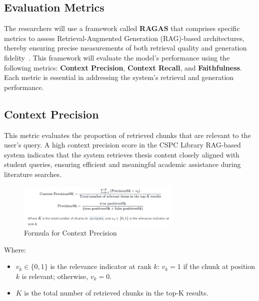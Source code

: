 \begin{refsection}
\section{Evaluation Metrics}

\hspace{0.4cm}The researchers will use a framework called \textbf{RAGAS} that comprises specific metrics to assess Retrieval-Augmented Generation (RAG)-based architectures, thereby ensuring precise measurements of both retrieval quality and generation fidelity~\cite{oubah2024advanced}. This framework will evaluate the model's performance using the following metrics: \textbf{Context Precision}, \textbf{Context Recall}, and \textbf{Faithfulness}. Each metric is essential in addressing the system’s retrieval and generation performance.

\subsection*{Context Precision}

This metric evaluates the proportion of retrieved chunks that are relevant to the user’s query. A high context precision score in the CSPC Library RAG-based system indicates that the system retrieves thesis content closely aligned with student queries, ensuring efficient and meaningful academic assistance during literature searches.


\begin{figure}[H]
\centering
\includegraphics[width=0.7\textwidth]{figures/context_precision_formula.png}
\caption{Formula for Context Precision}
\label{fig:context_precision}
\end{figure}

\noindent Where:
\begin{itemize}
    \item $v_k \in \{0,1\}$ is the relevance indicator at rank $k$: $v_k = 1$ if the chunk at position $k$ is relevant; otherwise, $v_k = 0$.
    \item $K$ is the total number of retrieved chunks in the top-K results.
\end{itemize}


\end{refsection}
